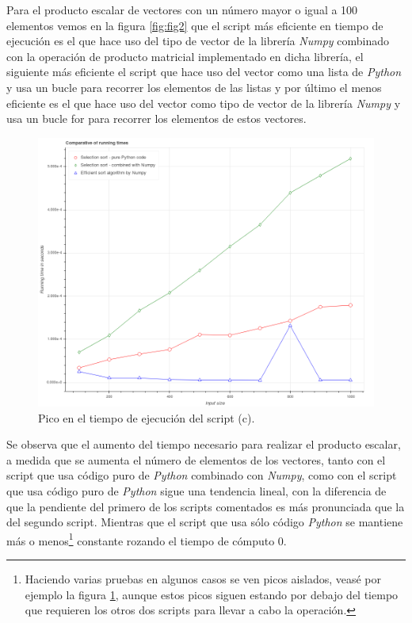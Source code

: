 \documentclass[12pt,twoside]{article}
\begin{document}
Para el producto escalar de vectores con un número mayor o igual a 100 elementos vemos en la figura \ref{fig:fig2} que el script más eficiente en tiempo de ejecución es el que hace uso del tipo de vector de la librería \textit{Numpy} combinado con la operación de producto matricial implementado en dicha librería, el siguiente más eficiente el script que hace uso del vector como una lista de \textit{Python} y usa un bucle para recorrer los elementos de las listas y por último el menos eficiente es el que hace uso del vector como tipo de vector de la librería \textit{Numpy} y usa un bucle for para recorrer los elementos de estos vectores.

\begin{figure}[hbt]
\begin{center}
	\includegraphics[width=1\textwidth]{22.png}
	\caption{Pico en el tiempo de ejecución del script (c).}
	\label{fig:fig3}
\end{center}
\end{figure}

Se observa que el aumento del tiempo necesario para realizar el producto escalar, a medida que se aumenta el número de elementos de los vectores, tanto con el script que usa código puro de \textit{Python} combinado con \textit{Numpy}, como con el script que usa código puro de \textit{Python} sigue una tendencia lineal, con la diferencia de que la pendiente del primero de los scripts comentados es más pronunciada que la del segundo script. Mientras que el script que usa sólo código \textit{Python} se mantiene más o menos\footnote{Haciendo varias pruebas en algunos casos se ven picos aislados, veasé por ejemplo la figura \ref{fig:fig3}, aunque estos picos siguen estando por debajo del tiempo que requieren los otros dos scripts para llevar a cabo la operación.} constante rozando el tiempo de cómputo 0.
\end{document}
